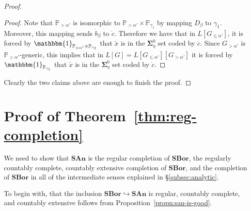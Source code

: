 \documentclass[11pt]{amsart}
\newcommand\hto{\hookrightarrow}
\newcommand\SAn{\mathbf{SAn}}
\newcommand\SBor{\mathbf{SBor}}
\newcommand\bbP{\mathbb{P}}
\newcommand\bbone{\mathbbm{1}}
\theoremstyle{definition}
\theoremstyle{remark}
\theoremstyle{plain}
\begin{document}
\begin{proof}
\begin{proof}
Note that $\bbP_{> \alpha'}$ is isomorphic to $\bbP_{> \alpha'}\times \bbP_{\gamma_1}$ by mapping $D_\beta$ to $\gamma_1$. Moreover, this mapping sends $\dot{b}_\beta$ to $\dot{c}$. Therefore we have that in $L[G_{\leq \alpha'}]$, it is forced by $\bbone_{\bbP_{> \alpha'}\times\bbP_{\gamma_1}}$ that $\check{x}$ is in the $\mathbf{\Sigma}^0_\eta$ set coded by $\dot{c}$. Since $G_{> \alpha'}$ is $\bbP_{> \alpha'}$-generic, this implies that in $L[G] = L[G_{\leq \alpha'}][G_{> \alpha'}]$ it is forced by $\bbone_{\bbP_{\gamma_1}}$ that $\check{x}$ is in the $\mathbf{\Sigma}^0_\eta$ set coded by $\dot{c}$.
\end{proof}

Clearly the two claims above are enough to finish the proof.
\end{proof}

\section{Proof of Theorem~\ref{thm:reg-completion}} \label{sec:reg-completion-proof}
We need to show that \( \SAn \) is the regular completion of \( \SBor \), the regularly countably complete, countably extensive completion of \( \SBor \), and the completion of \( \SBor \) in all of the intermediate senses explained in \S\ref{subsec:analytic}.

To begin with, that the inclusion \( \SBor \hto \SAn \) is regular, countably complete, and countably extensive follows from Proposition~\ref{propn:san-is-good}.
\end{document}
